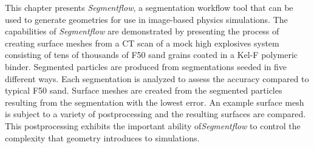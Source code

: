This chapter presents \textit{Segmentflow}, a segmentation workflow tool
that can be used to generate geometries for use in image-based
physics simulations.
The capabilities of \textit{Segmentflow} are demonstrated
by presenting the process of creating surface meshes
from a CT scan of a mock high explosives system consisting of tens of
thousands of F50 sand grains coated in a Kel-F polymeric binder.
Segmented particles are produced from segmentations seeded in five different
ways. Each segmentation is analyzed to assess the accuracy compared to
typical F50 sand.
Surface meshes are created from the segmented particles resulting from
the segmentation with the lowest error. An example surface mesh is subject to
a variety of postprocessing and the resulting surfaces are compared.
This postprocessing exhibits the important ability of\textit{Segmentflow}
to control the complexity that geometry introduces to simulations.

